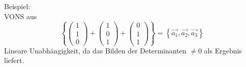 \documentclass{article}
\begin{document}
Beispiel:\\
VONS aus
\begin{equation*}
    \left\{
    \left(\begin{array}{c}
        1 \\ 1 \\ 0
    \end{array}\right) + \left(\begin{array}{c}
        1 \\ 0 \\ 1
    \end{array}\right) + \left(\begin{array}{c}
        0 \\ 1 \\ 1
    \end{array}\right)
    \right\} = \left\{\vec{a_1},\vec{a_2},\vec{a_3}\right\}
\end{equation*}
Lineare Unabhängigkeit, da das Bilden der Determinanten $\neq 0$ als Ergebnis liefert.\\
\end{document}
